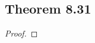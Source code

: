 \documentclass[../../main.tex]{subfiles}
\begin{document}
\subsection{Theorem 8.31}
\begin{wts}

\end{wts}
\begin{proof}

\end{proof}
\end{document}
